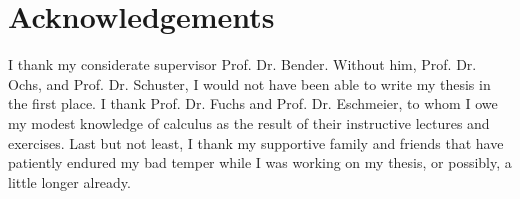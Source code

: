 \chapter*{Acknowledgements}

I thank my considerate supervisor Prof. Dr. Bender. Without him, Prof. Dr. Ochs, and Prof. Dr. Schuster, I would not have been able to write my thesis in the first place. I thank Prof. Dr. Fuchs and Prof. Dr. Eschmeier, to whom I owe my modest knowledge of calculus as the result of their instructive lectures and exercises. Last but not least, I thank my supportive family and friends that have patiently endured my bad temper while I was working on my thesis, or possibly, a little longer already.